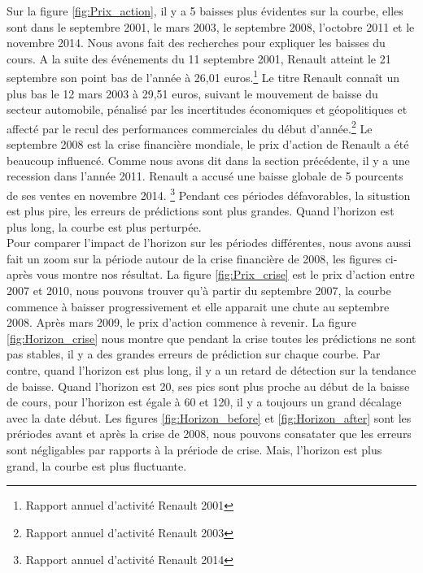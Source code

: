 Sur la figure \ref{fig:Prix_action}, il y a 5 baisses plus évidentes sur la courbe, elles sont dans le septembre 2001, le mars 2003, le septembre 2008, l'octobre 2011 et le novembre 2014. Nous avons fait des recherches pour expliquer les baisses du cours. A la suite des événements du 11 septembre 2001, Renault atteint le 21 septembre son point bas de l'année à 26,01 euros.\footnote{Rapport annuel d’activité
Renault 2001} Le titre Renault connaît un plus bas le 12 mars 2003 à 29,51 euros, suivant le mouvement de baisse du secteur automobile, pénalisé par les incertitudes économiques et géopolitiques et affecté par le recul des performances commerciales du début d’année.\footnote{Rapport annuel d’activité
Renault 2003} Le septembre 2008 est la crise financière mondiale, le prix d'action de Renault a été beaucoup influencé. Comme nous avons dit dans la section précédente, il y a une recession dans l'année 2011. Renault a accusé une baisse globale de 5 pourcents de ses ventes en novembre 2014. \footnote{Rapport annuel d’activité Renault 2014} Pendant ces périodes défavorables, la situstion est plus pire, les erreurs de prédictions sont plus grandes. Quand l'horizon est plus long, la courbe est plus perturpée. \\ 


Pour comparer l'impact de l'horizon sur les périodes différentes, nous avons aussi fait un zoom sur la période autour de la crise financière de 2008, les figures ci-après vous montre nos résultat. La figure \ref{fig:Prix_crise} est le prix d'action entre 2007 et 2010, nous pouvons trouver qu'à partir du septembre 2007, la courbe commence à baisser progressivement et elle apparait une chute au septembre 2008. Après mars 2009, le prix d'action commence à revenir. La figure \ref{fig:Horizon_crise} nous montre que pendant la crise toutes les prédictions ne sont pas stables, il y a des grandes erreurs de prédiction sur chaque courbe. Par contre, quand l'horizon est plus long, il y a un retard de détection sur la tendance de baisse. Quand l'horizon est 20, ses pics sont plus proche au début de la baisse de cours, pour l'horizon est égale à 60 et 120, il y a toujours un grand décalage avec la date début. Les figures \ref{fig:Horizon_before} et \ref{fig:Horizon_after} sont les prériodes avant et après la crise de 2008, nous pouvons consatater que les erreurs sont négligables par rapports à la prériode de crise. Mais, l'horizon est plus grand, la courbe est plus fluctuante.

